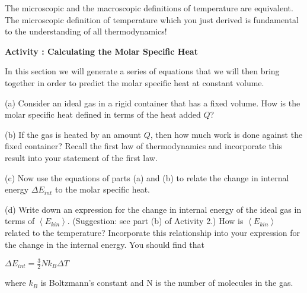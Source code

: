 The microscopic and the macroscopic definitions of temperature are
equivalent. The microscopic definition of temperature which you just
derived is fundamental to the understanding of all thermodynamics!

\textbf{Activity : Calculating the Molar Specific Heat}

In this section we will generate a series of equations that we will
then bring together in order to predict the molar specific heat at
constant volume.
\vspace{1in}

(a) Consider an ideal gas in a rigid container that has a fixed volume.
How is the molar specific heat defined in terms of the heat added \( Q \)?
\vspace{1in}

(b) If the gas is heated by an amount \( Q \), then how much work is done
against the fixed container? Recall the first law of thermodynamics
and incorporate this result into your statement of the first law.
\vspace{1in}

(c) Now use the equations of parts (a) and (b) to relate the change
in internal energy \( \Delta E_{int} \) to the molar specific heat.
\vspace{1in}


\newpage

(d) Write down an expression for  the change in internal
energy of the ideal gas in terms of \( \left\langle E_{kin}\right\rangle  \).
(Suggestion: see part (b) of Activity 2.)
How is \( \left\langle E_{kin}\right\rangle  \) related to the temperature?
Incorporate this relationship into your expression for the change
in the internal energy. You should find that

{\centering \( \Delta E_{int}=\frac{3}{2}Nk_{B}\Delta T \)\par}

where \( k_{B} \) is Boltzmann's constant and N is the number of
molecules in the gas.
\vspace{1in}

